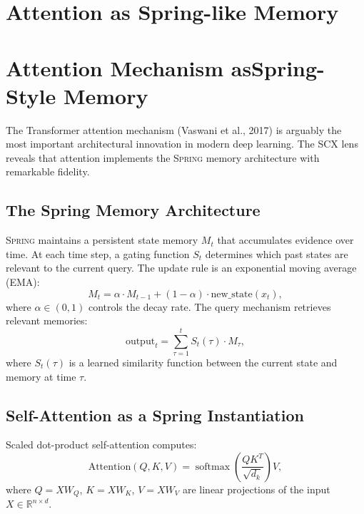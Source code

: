 \documentclass[12pt,a4paper]{article}
\theoremstyle{definition}
\newcommand{\Spring}{\textsc{Spring}}
\newcommand{\SCX}{\textsc{SCX}}
\DeclareMathOperator{\softmax}{softmax}
\newcommand{\R}{\mathbb{R}}
\begin{document}
\section{Attention as Spring-like Memory}
\section{Attention Mechanism asSpring-Style Memory}
\label{sec:attention}

The Transformer attention mechanism (Vaswani et al., 2017) is arguably the most important architectural innovation in modern deep learning. The \SCX{} lens reveals that attention implements the \Spring{} memory architecture with remarkable fidelity.

\subsection{The Spring Memory Architecture}

\Spring{} maintains a persistent state memory $M_t$ that accumulates evidence over time. At each time step, a gating function $S_t$ determines which past states are relevant to the current query. The update rule is an exponential moving average (EMA):
\begin{equation}\label{eq:spring_update}
    M_{t} = \alpha \cdot M_{t-1} + (1-\alpha) \cdot \text{new\_state}(x_t),
\end{equation}
where $\alpha \in (0,1)$ controls the decay rate. The query mechanism retrieves relevant memories:
\begin{equation}\label{eq:spring_query}
    \text{output}_t = \sum_{\tau=1}^{t} S_t(\tau) \cdot M_\tau,
\end{equation}
where $S_t(\tau)$ is a learned similarity function between the current state and memory at time $\tau$.

\subsection{Self-Attention as a Spring Instantiation}

Scaled dot-product self-attention computes:
\begin{equation}\label{eq:attention}
    \text{Attention}(Q, K, V) = \softmax\left(\frac{QK^T}{\sqrt{d_k}}\right) V,
\end{equation}
where $Q = XW_Q$, $K = XW_K$, $V = XW_V$ are linear projections of the input $X \in \R^{n \times d}$.
\end{document}
